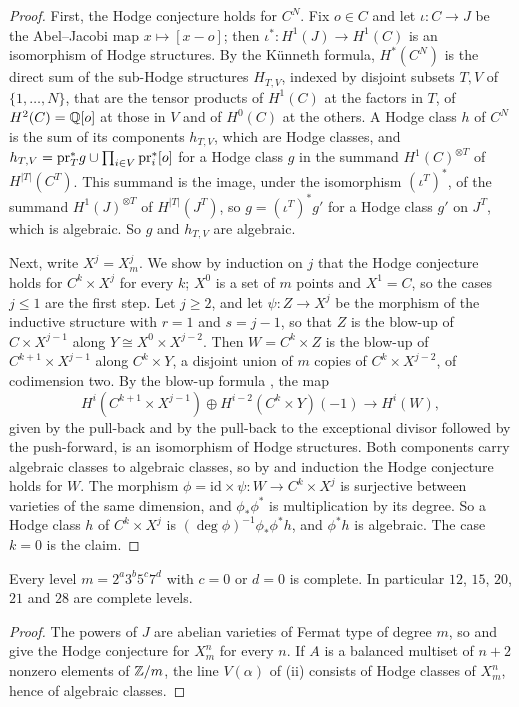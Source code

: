 \begin{proof}
First, the Hodge conjecture holds for $C^{N}$. Fix $o\in C$ and let
$\iota\colon C\to J$ be the Abel--Jacobi map $x\mapsto[x-o]$; then
$\iota^{*}\colon H^{1}(J)\to H^{1}(C)$ is an isomorphism of Hodge
structures. By the K\"unneth formula, $H^{*}(C^{N})$ is the direct sum of
the sub-Hodge structures $H_{T,V}$, indexed by disjoint subsets $T,V$ of
$\{1,\dots,N\}$, that are the tensor products of $H^{1}(C)$ at the factors in
$T$, of $H^{2}(C)=\mathbb{Q}[o]$ at those in $V$ and of $H^{0}(C)$ at the others. A
Hodge class $h$ of $C^{N}$ is the sum of its components $h_{T,V}$, which are
Hodge classes, and $h_{T,V}=\mathrm{pr}_{T}^{*}g\cup\prod_{i\in V}\mathrm{pr}_{i}^{*}[o]$
for a Hodge class $g$ in the summand $H^{1}(C)^{\otimes T}$ of
$H^{|T|}(C^{T})$. This summand is the image, under the isomorphism
$(\iota^{T})^{*}$, of the summand $H^{1}(J)^{\otimes T}$ of $H^{|T|}(J^{T})$,
so $g=(\iota^{T})^{*}g'$ for a Hodge class $g'$ on $J^{T}$, which is
algebraic. So $g$ and $h_{T,V}$ are algebraic.

Next, write $X^{j}=X^{j}_{m}$. We show by induction on $j$ that the Hodge
conjecture holds for $C^{k}\times X^{j}$ for every $k$; $X^{0}$ is a set of
$m$ points and $X^{1}=C$, so the cases $j\le1$ are the first step. Let
$j\ge2$, and let $\psi\colon Z\to X^{j}$ be the morphism of the inductive
structure with $r=1$ and $s=j-1$, so that $Z$ is the blow-up of $C\times
X^{j-1}$ along $Y\cong X^{0}\times X^{j-2}$. Then $W=C^{k}\times Z$ is the
blow-up of $C^{k+1}\times X^{j-1}$ along $C^{k}\times Y$, a disjoint union
of $m$ copies of $C^{k}\times X^{j-2}$, of codimension two. By the blow-up
formula \cite[Theorem~7.31]{Voi02b}, the map
\[
  H^{i}(C^{k+1}\times X^{j-1})\oplus H^{i-2}(C^{k}\times Y)(-1)\to
  H^{i}(W),
\]
given by the pull-back and by the pull-back to the exceptional divisor
followed by the push-forward, is an isomorphism of Hodge structures. Both
components carry algebraic classes to algebraic classes, so by
 and induction the Hodge conjecture holds for $W$. The
morphism $\phi=\mathrm{id}\times\psi\colon W\to C^{k}\times X^{j}$ is
surjective between varieties of the same dimension, and
$\phi_{*}\phi^{*}$ is multiplication by its degree. So a Hodge class $h$ of
$C^{k}\times X^{j}$ is $(\deg\phi)^{-1}\phi_{*}\phi^{*}h$, and $\phi^{*}h$
is algebraic. The case $k=0$ is the claim.
\end{proof}

\begin{proposition}\label{prop:aokidegrees}
Every level $m=2^{a}3^{b}5^{c}7^{d}$ with $c=0$ or $d=0$ is complete. In
particular $12$, $15$, $20$, $21$ and $28$ are complete levels.
\end{proposition}

\begin{proof}
The powers of $J$ are abelian varieties of Fermat type of degree $m$, so
\cite[Theorem~0.1]{Aok00} and  give the Hodge
conjecture for $X^{n}_{m}$ for every $n$. If $A$ is a balanced multiset of
$n+2$ nonzero elements of $\mathbb{Z}/m$, the line $V(\alpha)$ of
(ii) consists of Hodge classes of $X^{n}_{m}$, hence
of algebraic classes.
\end{proof}
